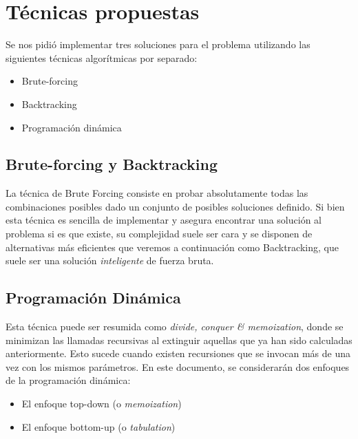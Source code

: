 \section{Técnicas propuestas}
Se nos pidió implementar tres soluciones para el problema utilizando las siguientes técnicas algorítmicas por separado:
\begin{itemize}
	\item Brute-forcing
	\item Backtracking
	\item Programación dinámica
\end{itemize}

\subsection{Brute-forcing y Backtracking}
La técnica de Brute Forcing consiste en probar absolutamente todas las combinaciones posibles dado un conjunto de posibles soluciones definido. Si bien esta técnica es sencilla de implementar y asegura encontrar una solución al problema si es que existe, su complejidad suele ser cara y se disponen de alternativas más eficientes que veremos a continuación como Backtracking, que suele ser una solución \textit{inteligente} de fuerza bruta.

\subsection{Programación Dinámica}
Esta técnica puede ser resumida como \textit{divide, conquer \& memoization}, donde se minimizan las llamadas recursivas al extinguir aquellas que ya han sido calculadas anteriormente. Esto sucede cuando existen recursiones que se invocan más de una vez con los mismos parámetros. En este documento, se considerarán dos enfoques de la programación dinámica:
\begin{itemize}
	\item El enfoque top-down (o \textit{memoization})
	\item El enfoque bottom-up (o \textit{tabulation})
\end{itemize}
